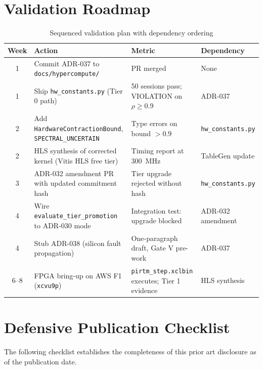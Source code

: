 \documentclass[12pt,letterpaper]{article}
\theoremstyle{plain}
\theoremstyle{definition}
\theoremstyle{remark}
\begin{document}
\section{Validation Roadmap}

\begin{table}[H]
\centering
\caption{Sequenced validation plan with dependency ordering}
\label{tab:validation}
\begin{tabular}{clll}
\toprule
\textbf{Week} & \textbf{Action} & \textbf{Metric} & \textbf{Dependency} \\
\midrule
1 & Commit ADR-037 to \texttt{docs/hypercompute/} & PR merged & None \\
1 & Ship \texttt{hw\_constants.py} (Tier 0 path)  & 50 sessions pass; VIOLATION on $\rho \geq 0.9$ & ADR-037 \\
2 & Add \texttt{HardwareContractionBound}, \texttt{SPECTRAL\_UNCERTAIN} & Type errors on bound $> 0.9$ & \texttt{hw\_constants.py} \\
2 & HLS synthesis of corrected kernel (Vitis HLS free tier) & Timing report at 300~MHz & TableGen update \\
3 & ADR-032 amendment PR with updated commitment hash & Tier upgrade rejected without hash & \texttt{hw\_constants.py} \\
4 & Wire \texttt{evaluate\_tier\_promotion} to ADR-030 mode & Integration test: upgrade blocked & ADR-032 amendment \\
4 & Stub ADR-038 (silicon fault propagation) & One-paragraph draft, Gate V pre-work & ADR-037 \\
6--8 & FPGA bring-up on AWS F1 (\texttt{xcvu9p}) & \texttt{pirtm\_step.xclbin} executes; Tier 1 evidence & HLS synthesis \\
\bottomrule
\end{tabular}
\end{table}

\section{Defensive Publication Checklist}

The following checklist establishes the completeness of this prior art
disclosure as of the publication date.
\end{document}
